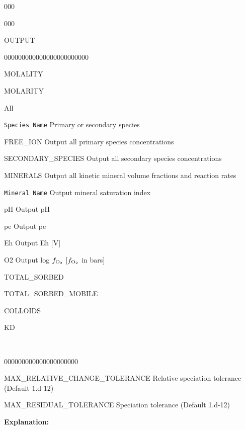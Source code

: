 \begin{deflist}{000}
\begin{deflist}{000}
\item[OUTPUT] ~
\begin{deflist}{000000000000000000000000}
\item[MOLALITY]
\item[MOLARITY]
\item[All]
\item[\tt Species Name] Primary or secondary species
\item[FREE\_ION] Output all primary species concentrations
\item[SECONDARY\_SPECIES] Output all secondary species concentrations
\item[MINERALS] Output all kinetic mineral volume fractions and reaction rates
\item[\tt Mineral Name] Output mineral saturation index
\item[pH] Output pH
\item[pe] Output pe
\item[Eh] Output Eh [V]
\item[O2] Output log $f_{\rm O_2}$ [$f_{\rm O_2}$ in bars]
\item[TOTAL\_SORBED]
\item[TOTAL\_SORBED\_MOBILE]
\item[COLLOIDS]
\item[KD]
\end{deflist}

\item [\keyend]

~ 

\end{deflist}
\begin{deflist}{000000000000000000000}
\item[MAX\_RELATIVE\_CHANGE\_TOLERANCE] Relative speciation tolerance (Default 1.d-12)
\item[MAX\_RESIDUAL\_TOLERANCE] Speciation tolerance (Default 1.d-12)
\end{deflist}

\item [\keyend]
\end{deflist}

\noindent
{\bf Explanation:}

